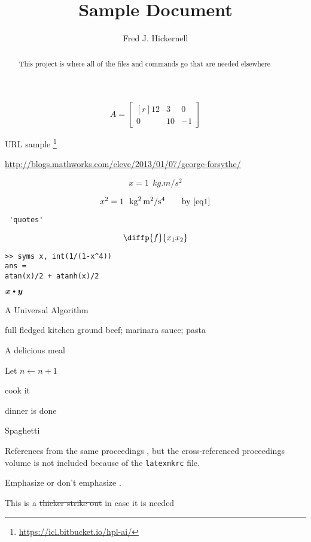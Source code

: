 \documentclass{amsart}
\newcommand{\citeColored}[2]{{\hypersetup{citecolor=#1}\cite{#2}}}
\begin{document}
\title{Sample Document}
\author{Fred J. Hickernell}
\begin{abstract}This project is where all of the files and commands go that are needed elsewhere
\end{abstract}

\maketitle

\[
A = \begin{bmatrix*}[r]
     12 & 3  & 0 \\
     0  & 10 &-1
   \end{bmatrix*}
\]

URL sample \footnote{\url{https://icl.bitbucket.io/hpl-ai/}}

\url{http://blogs.mathworks.com/cleve/2013/01/07/george-forsythe/}

\begin{equation} \label{eq1}
    x = 1 \ \ \si{kg.m/s^2}
\end{equation}

\begin{equation}
    x^2 = 1 \ \ \si{kg^2.m^2/s^4} \qquad \text{by  \cref{eq1}}
\end{equation}

\begin{verbatim} 'quotes' \end{verbatim}

\[
\diffp{f}{{x_1}{x_2}}
\]


\begin{Verbatim}[fontsize=\small,formatcom=\color{blue}]
>> syms x, int(1/(1-x^4))
ans =
atan(x)/2 + atanh(x)/2
\end{Verbatim}

$\vx \bigcdot \vy$

\begin{algorithm}[H]
\caption{A Universal Algorithm \label{alg:basicadapt}}
	\begin{algorithmic}
	\PARAM full fledged kitchen
	\INPUT ground beef; marinara sauce; pasta

    \Ensure A delicious meal

\Repeat

\State Let $n \leftarrow n + 1$

\State cook it

\Until dinner is done

\RETURN Spaghetti

\end{algorithmic}
\end{algorithm}

References from the same proceedings \cite{HicJim16a,JimHic16a}, but the cross-referenced proceedings volume is not included because of the \texttt{latexmkrc} file.

Emphasize \citeColored{red}{Hic97a} or don't emphasize \cite{Hic97a}.

This is a \sout{thicker strike out} in case it is needed



\end{document}
